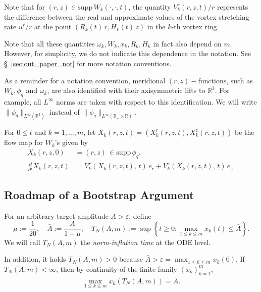 \documentclass[reqno,11pt]{amsart}
\begin{document}
    Note that for $(r,z)\in \mathrm{supp} \, W_k(\cdot, \cdot,t)$, the quantity $V^r_k(r,z,t)/r$ represents the difference between the real and approximate values of the vortex stretching rate $u^r/r$ at the point $(R_k(t) \,r, H_k (t)\, z)$ in the $k$-th vortex ring.
    
    Note that all these quantities $\omega_k,   W_k, x_k,R_k,H_k$ in fact also depend on $m$. However, for simplicity, we do not indicate this dependence in the notation. See \S~\ref{sec:out_paper_not} for more notation conventions.


As a reminder for a notation convention, meridional $(r,z)-$functions, such as $W_k,\phi_q$ and $\omega_k$, are also identified with their axisymmetric lifts to $\mathbb{R}^3$. For example, all $L^\infty$ norms are taken with respect to this identification. We will write $\|\phi_q\|_{L^\infty(\mathbb{R}^3)}$ instead of $\|\phi_q\|_{L^\infty(\mathbb{R}_+\times \mathbb{R})}$.

For $0\leq t$ and $k=1,\ldots,m$, let $X_k(r,z,t)=(X^r_k(r,z,t), X^z_k(r,z,t))$ be the flow map for $W_k$'s given by
    \begin{align*}
        X_k(r,z,  0)&=(r,z) \, \in \mathrm{supp}\,\phi_q,
        \\
        \frac{\partial }{\partial t} 
        X_k (r,z,t)&=
        V^r_k \left( 
                X_k(r,z, t),\, t
            \right) \, e_r
        +V^z_k \left(
                X_k(r,z, t),\, t
            \right) \, e_z.
    \end{align*}



\subsection{Roadmap of a Bootstrap Argument}
\label{roadmap_boot_Euler}

 
For an arbitrary target amplitude $A>  \varepsilon$, define
\begin{equation}\label{def:Euler_ni_time}
\mu:= \frac{1}{20}, \quad \bar A:= \frac{A}{1-\mu}, 
\quad T_N(A,m):=
\sup \left\{t\geq 0: \max_{1\leq k \leq m} x_k(t) \leq \bar A\right\}
.
\end{equation}
We will call $T_N(A,m)$ the  \emph{norm-inflation time} at the ODE level.

In addition, it holds $T_N(A,m)>0$ because
$\bar A > \varepsilon= \max_{1\leq k\leq m} x_k(0).$ If $T_N(A,m)<\infty$, then by continuity of the finite family $(x_k)_{k=1}^m$, 
    \begin{align*}
        \max_{1\leq k \leq m}
        x_k(T_N(A,m))=\bar A.
    \end{align*}
\end{document}
